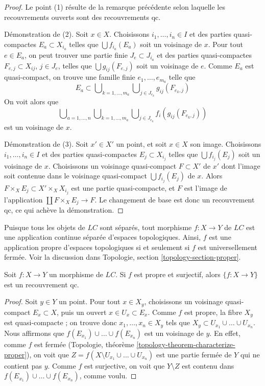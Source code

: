 \begin{proof}
Le point (1) résulte de la remarque précédente selon laquelle les
recouvrements ouverts sont des recouvrements qc.

\medskip\noindent
Démonstration de (2). Soit $x \in X$. Choisissons
$i_1, \ldots, i_n \in I$ et des parties quasi-compactes
$E_a \subset X_{i_a}$ telles que $\bigcup f_{i_a}(E_a)$ soit un voisinage
de $x$. Pour tout $e \in E_a$, on peut trouver une partie finie
$J_e \subset J_{i_a}$ et des parties quasi-compactes
$F_{e, j} \subset X_{ij}$, $j \in J_e$, telles que
$\bigcup g_{ij}(F_{e, j})$ soit un voisinage de $e$. Comme $E_a$ est
quasi-compact, on trouve une famille finie
$e_1, \ldots, e_{m_a}$ telle que
$$
E_a \subset
\bigcup\nolimits_{k = 1, \ldots, m_a}
\bigcup\nolimits_{j \in J_{e_k}} g_{ij}(F_{e_k, j})
$$
On voit alors que
$$
\bigcup\nolimits_{a = 1, \ldots, n}
\bigcup\nolimits_{k = 1, \ldots, m_a}
\bigcup\nolimits_{j \in J_{e_k}} f_i(g_{ij}(F_{e_k, j}))
$$
est un voisinage de $x$.

\medskip\noindent
Démonstration de (3). Soit $x' \in X'$ un point, et soit $x \in X$ son
image. Choisissons $i_1, \ldots, i_n \in I$ et des parties quasi-compactes
$E_j \subset X_{i_j}$ telles que $\bigcup f_{i_j}(E_j)$ soit un voisinage
de $x$. Choisissons un voisinage quasi-compact $F \subset X'$ de $x'$ dont
l'image soit contenue dans le voisinage quasi-compact
$\bigcup f_{i_j}(E_j)$ de $x$. Alors
$F \times_X E_j \subset X' \times_X X_{i_j}$ est une partie quasi-compacte,
et $F$ est l'image de l'application
$\coprod F \times_X E_j \to F$. Le changement de base est donc un
recouvrement qc, ce qui achève la démonstration.
\end{proof}

\noindent
Puisque tous les objets de $\textit{LC}$ sont séparés, tout morphisme
$f : X \to Y$ de $\textit{LC}$ est une application continue séparée
d'espaces topologiques. Ainsi, $f$ est une application propre d'espaces
topologiques si et seulement si $f$ est universellement fermée. Voir la
discussion dans Topologie, section \ref{topology-section-proper}.

\begin{lemma}
\label{lemma-proper-surjective-is-qc-covering}
Soit $f : X \to Y$ un morphisme de $\textit{LC}$. Si $f$ est propre et
surjectif, alors $\{f : X \to Y\}$ est un recouvrement qc.
\end{lemma}

\begin{proof}
Soit $y \in Y$ un point. Pour tout $x \in X_y$, choisissons un voisinage
quasi-compact $E_x \subset X$, puis un ouvert $x \in U_x \subset E_x$.
Comme $f$ est propre, la fibre $X_y$ est quasi-compacte ; on trouve donc
$x_1, \ldots, x_n \in X_y$ tels que
$X_y \subset U_{x_1} \cup \ldots \cup U_{x_n}$.
Nous affirmons que $f(E_{x_1}) \cup \ldots \cup f(E_{x_n})$ est un voisinage
de $y$. En effet, comme $f$ est fermée
(Topologie, théorème \ref{topology-theorem-characterize-proper}),
on voit que
$Z = f(X \setminus U_{x_1} \cup \ldots \cup U_{x_n})$
est une partie fermée de $Y$ qui ne contient pas $y$. Comme $f$ est
surjective, on voit que $Y \setminus Z$ est contenu dans
$f(E_{x_1}) \cup \ldots \cup f(E_{x_n})$, comme voulu.
\end{proof}

